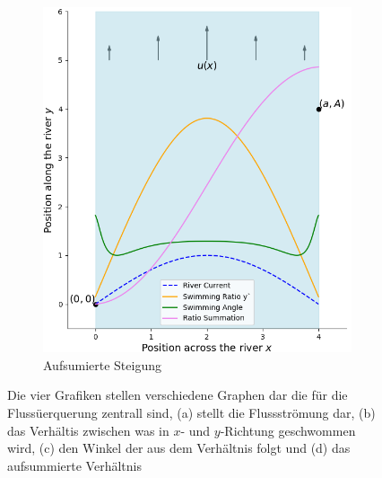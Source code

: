 \begin{figure}
\begin{subfigure}{0.48\textwidth}
        \includegraphics[width=\textwidth]{papers/schwimmen/Grafiken/Figure_5-crop.png}	
        \caption{Aufsumierte Steigung}
        \label{fig:sin_velocity}
    \end{subfigure}
    \par\bigskip
    \caption{Die vier Grafiken stellen verschiedene Graphen dar die für die Flussüerquerung zentrall sind, (a) stellt die Flussströmung dar, (b) das Verhältis zwischen was in \(x\)- und \(y\)-Richtung geschwommen wird, (c) den Winkel der aus dem Verhältnis folgt und (d) das aufsummierte Verhältnis}
    \label{fig:river_pfrofiles}
\end{figure}
